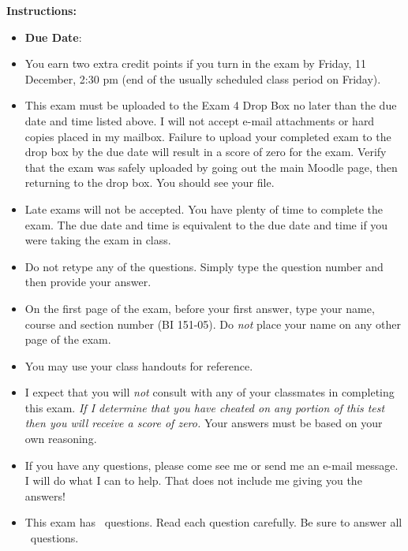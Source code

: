 \documentclass[11pt, addpoints]{exam}
\begin{document}
\textbf{Instructions:}

\begin{itemize}

\item
  \textbf{Due Date}: 

\item You earn two extra credit points if you turn in the exam by Friday, 11 December, 2:30 pm (end of the usually scheduled class period on Friday).

\item
  This exam must be uploaded to the Exam 4 Drop Box no later than the due
  date and time listed above. I will not accept e-mail attachments or hard copies
  placed in my mailbox. Failure to upload your completed exam to the drop box
  by the due date will result in a score of zero for the exam. Verify that the exam
  was safely uploaded by going out the main Moodle page, then returning to the
  drop box. You should see your file.

\item
  Late exams will not be accepted. You have plenty of time to complete the exam.
  The due date and time is equivalent to the due date and time if you were taking
  the exam in class.

\item
  Do not retype any of the questions. Simply type the question
  number and then provide your answer.
  
\item
  On the first page of the exam, before your first answer, type your
  name, course and section number (BI 151-05). Do \emph{not} place your name on
  any other page of the exam.
  
  
\item
  You may use your class handouts for reference.
  
\item
  I expect that you will \emph{not} consult with any of your classmates in
  completing this exam. \emph{If I determine that you have cheated on
  any portion of this test then you will receive a score of zero.} Your answers
  must be based on your own reasoning.
  
\item
  If you have any questions, please come see me or send me an e-mail
  message. I will do what I can to help. That does not include me giving you the answers!
  
\item
  This exam has \numquestions~questions. Read each question carefully. Be sure to
  answer all \numquestions~questions.
  
\end{itemize}
\end{document}
